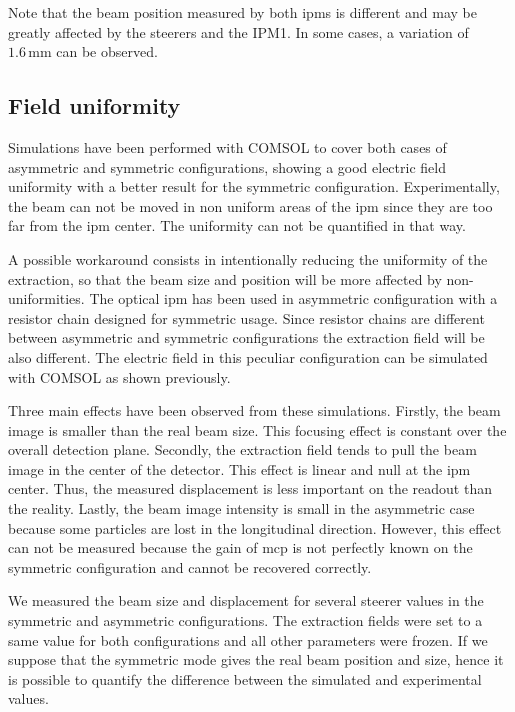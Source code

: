 \begin{refsection}
  Note that the beam position measured by both \acrshort{ipm}s is different and may be greatly affected by the steerers and the IPM1. In some cases, a variation of $1.6\,\mathrm{mm}$ can be observed.

  \subsection{Field uniformity}
  \label{chap4:sec:field_uniformity}
  Simulations have been performed with COMSOL to cover both cases of asymmetric and symmetric configurations, showing a good electric field uniformity with a better result for the symmetric configuration. Experimentally, the beam can not be moved in non uniform areas of the \acrshort{ipm} since they are too far from the \acrshort{ipm} center. The uniformity can not be quantified in that way.

  A possible workaround consists in intentionally reducing the uniformity of the extraction, so that the beam size and position will be more affected by non-uniformities. The optical \acrshort{ipm} has been used in asymmetric configuration with a resistor chain designed for symmetric usage. Since resistor chains are different between asymmetric and symmetric configurations the extraction field will be also different. The electric field in this peculiar configuration can be simulated with COMSOL as shown previously.

  Three main effects have been observed from these simulations. Firstly, the beam image is smaller than the real beam size. This focusing effect is constant over the overall detection plane. Secondly, the extraction field tends to pull the beam image in the center of the detector. This effect is linear and null at the \acrshort{ipm} center. Thus, the measured displacement is less important on the readout than the reality. Lastly, the beam image intensity is small in the asymmetric case because some particles are lost in the longitudinal direction. However, this effect can not be measured because the gain of \acrshort{mcp} is not perfectly known on the symmetric configuration and cannot be recovered correctly.

  We measured the beam size and displacement for several steerer values in the symmetric and asymmetric configurations.
  The extraction fields were set to a same value for both configurations and all other parameters were frozen. If we suppose that the symmetric mode gives the real beam position and size, hence it is possible to quantify the difference between the simulated and experimental values.


\end{refsection}
